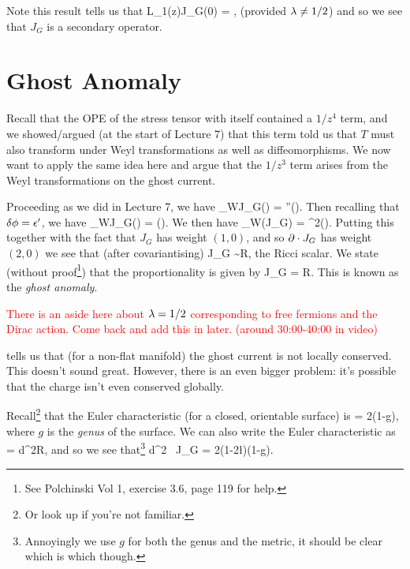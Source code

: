 \br 
    Note this result tells us that 
    \bse 
        L_1(z)J_G(0) = \Res{} ,
    \ese 
    (provided $\lambda\neq1/2$) and so we see that $J_G$ is a secondary operator. 
\er 

\section{Ghost Anomaly}

Recall that the OPE of the stress tensor with itself contained a $1/z^4$ term, and we showed/argued (at the start of Lecture 7) that this term told us that $T$ must also transform under Weyl transformations as well as diffeomorphisms. We now want to apply the same idea here and argue that the $1/z^3$ term arises from the Weyl transformations on the ghost current. 

Proceeding as we did in Lecture 7, we have 
\bse 
    \del_WJ_G(\omega) = \epsilon''(\omega).
\ese 
Then recalling that $\delta\phi = \epsilon'$, we have 
\bse 
    \del_WJ_G(\omega) = \p(\del\phi).
\ese 
We then have 
\bse 
    \del_W(\p\cdot J_G) = \nabla^2(\del\phi). 
\ese
Putting this together with the fact that $J_G$ has weight $(1,0)$, and so $\partial\cdot J_G$ has weight $(2,0)$ we see that (after covariantising) 
\bse 
    \nabla \cdot J_G \sim R,
\ese
the Ricci scalar. We state (without proof\footnote{See Polchinski Vol 1, exercise 3.6, page 119 for help.}) that the proportionality is given by 
\be 
\label{eqn:GhostAnomaly}
    \nabla \cdot J_G = R.
\ee 
This is known as the \textit{ghost anomaly}.

\br 
    \textcolor{red}{There is an aside here about $\lambda=1/2$ corresponding to free fermions and the Dirac action. Come back and add this in later. (around 30:00-40:00 in video)}
\er 

 tells us that (for a non-flat manifold) the ghost current is not locally conserved. This doesn't sound great. However, there is an even bigger problem: it's possible that the charge isn't even conserved globally. 

Recall\footnote{Or look up if you're not familiar.} that the Euler characteristic (for a closed, orientable surface) is
\bse 
    \chi = 2(1-g),
\ese
where $g$ is the \textit{genus} of the surface. We can also write the Euler characteristic as
\bse 
    \chi = \int d^2\sig {}R,
\ese 
and so we see that\footnote{Annoyingly we use $g$ for both the genus and the metric, it should be clear which is which though.} 
\bse 
    \int d^2\sig {} \, \nabla \cdot J_G = 2\pi(1-2\l)(1-g).
\ese 

